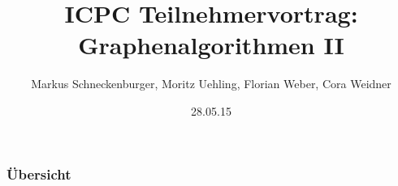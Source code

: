 \documentclass{beamer}
\title[Graphen II]{ICPC Teilnehmervortrag: Graphenalgorithmen II} %
\author{Markus Schneckenburger, Moritz Uehling, Florian Weber, Cora Weidner } %
\institute[UCLA] %
{
	KIT\\ICPC-Teilnehmervortrag
}
\date{28.05.15} %
\begin{document}
\begin{frame}
\titlepage %
\end{frame}

\begin{frame}
\frametitle{Übersicht} 
\tableofcontents
\end{frame}

%





\end{document}
